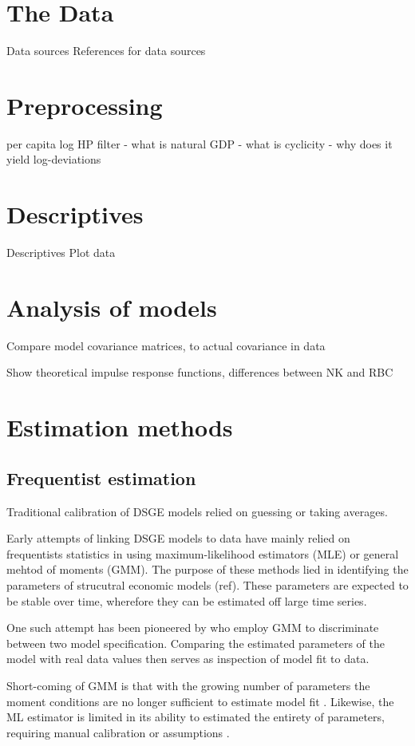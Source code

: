 \documentclass[11pt,a4paper,english]{article} %
\begin{document}
	\section{The Data}
	Data sources
	References for data sources
	
	\section{Preprocessing}
	per capita
	log
	HP filter
	- what is natural GDP
	- what is cyclicity
	- why does it yield log-deviations
	
	
	\section{Descriptives}
	Descriptives
	Plot data
	
	\section{Analysis of models}
	Compare model covariance matrices, to actual covariance in data
	
	Show theoretical impulse response functions, differences between NK and RBC
	
	\section{Estimation methods}
	
	\subsection{Frequentist estimation}
	Traditional calibration of DSGE models relied on guessing or taking averages.
	
	Early attempts of linking DSGE models to data have mainly relied on frequentists statistics in using maximum-likelihood estimators (MLE) or general mehtod of moments (GMM).
	The purpose of these methods lied in identifying the parameters of strucutral economic models (ref). These parameters are expected to be stable over time, wherefore they can be estimated off large time series. 
	
	One such attempt has been pioneered by \cite{christiano_current_1992} who employ GMM to discriminate between two model specification. Comparing the estimated parameters of the model with real data values then serves as inspection of model fit to data.
	
	Short-coming of GMM is that with the growing number of parameters the moment conditions are no longer sufficient to estimate model fit \cite{guerron-quintana_bayesian_2013}. Likewise, the ML estimator is limited in its ability to estimated the entirety of parameters, requiring manual calibration or assumptions \cite{guerron-quintana_bayesian_2013}.
	
\end{document}
